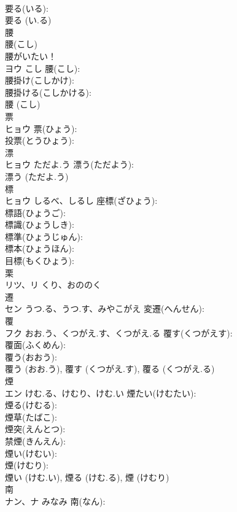 \documentclass[8pt]{extreport}
\begin{document}
\begin{CJK}{UTF8}{min}
\\	要る(いる): 
\\	要る (い.る)
\\	腰			
\\	腰(こし) 
\\	腰がいたい！
\\	ヨウ	こし	腰(こし): 
\\	腰掛け(こしかけ): 
\\	腰掛ける(こしかける): 
\\	腰 (こし)
\\	票			
\\	ヒョウ		票(ひょう): 
\\	投票(とうひょう): 
\\	漂			
\\	ヒョウ	ただよ.う	漂う(ただよう): 
\\	漂う (ただよ.う)
\\	標			
\\	ヒョウ	しるべ、しるし	座標(ざひょう): 
\\	標語(ひょうご): 
\\	標識(ひょうしき): 
\\	標準(ひょうじゅん): 
\\	標本(ひょうほん): 
\\	目標(もくひょう): 
\\	栗			
\\	リツ、リ	くり、おののく		
\\	遷			
\\	セン	うつ.る、うつ.す、みやこがえ	変遷(へんせん): 
\\	覆			
\\	フク	おお.う、くつがえ.す、くつがえ.る	覆す(くつがえす): 
\\	覆面(ふくめん): 
\\	覆う(おおう): 
\\	覆う (おお.う), 覆す (くつがえ.す), 覆る (くつがえ.る)
\\	煙			
\\	エン	けむ.る、けむり、けむ.い	煙たい(けむたい): 
\\	煙る(けむる): 
\\	煙草(たばこ): 
\\	煙突(えんとつ): 
\\	禁煙(きんえん): 
\\	煙い(けむい): 
\\	煙(けむり): 
\\	煙い (けむ.い), 煙る (けむ.る), 煙 (けむり)
\\	南			
\\	ナン、ナ	みなみ	南(なん): 

\end{CJK}
\end{document}
